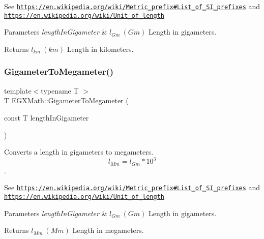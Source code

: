 See \href{https://en.wikipedia.org/wiki/Metric_prefix#List_of_SI_prefixes}{\tt https\+://en.\+wikipedia.\+org/wiki/\+Metric\+\_\+prefix\#\+List\+\_\+of\+\_\+\+S\+I\+\_\+prefixes} and \href{https://en.wikipedia.org/wiki/Unit_of_length}{\tt https\+://en.\+wikipedia.\+org/wiki/\+Unit\+\_\+of\+\_\+length} 
\begin{DoxyParams}{Parameters}
{\em length\+In\+Gigameter} & $ l_{Gm}\ (Gm)$ Length in gigameters. \\
\hline
\end{DoxyParams}
\begin{DoxyReturn}{Returns}
$ l_{km}\ (km)$ Length in kilometers. 
\end{DoxyReturn}
\mbox{\label{group___e_g_x_math-_conversions-_length_conversions-_gigameter-_s_i_ga13984c61b3aaa41953de2415c6981f37}} 
\subsubsection{\texorpdfstring{Gigameter\+To\+Megameter()}{GigameterToMegameter()}}
{\footnotesize\ttfamily template$<$typename T $>$ \\
T E\+G\+X\+Math\+::\+Gigameter\+To\+Megameter (\begin{DoxyParamCaption}\item[{const T}]{length\+In\+Gigameter }\end{DoxyParamCaption})}



Converts a length in gigameters to megameters. \[ l_{Mm}=l_{Gm} * 10^{3} \]. 

See \href{https://en.wikipedia.org/wiki/Metric_prefix#List_of_SI_prefixes}{\tt https\+://en.\+wikipedia.\+org/wiki/\+Metric\+\_\+prefix\#\+List\+\_\+of\+\_\+\+S\+I\+\_\+prefixes} and \href{https://en.wikipedia.org/wiki/Unit_of_length}{\tt https\+://en.\+wikipedia.\+org/wiki/\+Unit\+\_\+of\+\_\+length} 
\begin{DoxyParams}{Parameters}
{\em length\+In\+Gigameter} & $ l_{Gm}\ (Gm)$ Length in gigameters. \\
\hline
\end{DoxyParams}
\begin{DoxyReturn}{Returns}
$ l_{Mm}\ (Mm)$ Length in megameters. 
\end{DoxyReturn}
\mbox{\label{group___e_g_x_math-_conversions-_length_conversions-_gigameter-_s_i_ga9573f9c296bf9043de80f6f6b13c0aa9}} 
